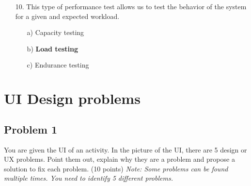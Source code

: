 \documentclass[12pt]{book}
\begin{document}
\begin{itemize}
    \item[10.] This type of performance test allows us to test the behavior of the system for a given and expected workload.
    \begin{itemize}
        \item[a)] Capacity testing
        \item[b)] \textbf{Load testing}
        \item[c)] Endurance testing
    \end{itemize} 

\end{itemize}
\newpage
\chapter{UI Design problems}

\section*{Problem 1}

You are given the UI of an activity. In the picture of the UI, there are 5 design or UX problems. Point them out, explain why they are a problem and propose a solution to fix each problem. (10 points) 
\textit{Note: Some problems can be found multiple times. You need to identify 5 different problems.}
\end{document}
